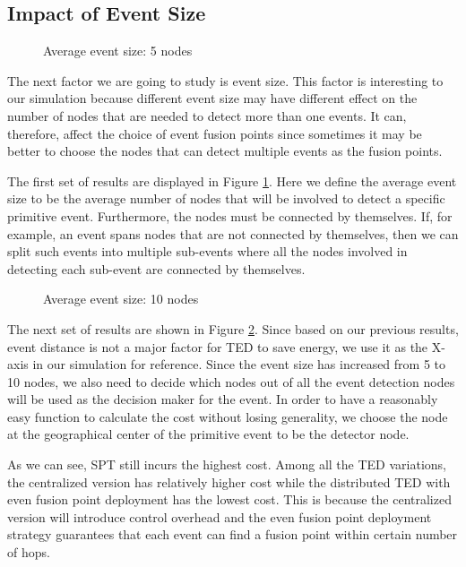 \subsection{Impact of Event Size}
\begin{figure}
\centering
{}
\caption{Average event size: 5 nodes}
\label{fig:sim-distance-size5}
\end{figure}

The next factor we are going to study is event size. This factor is interesting to our simulation because different event size may have different effect on the number of nodes that are needed to detect more than one events. It can, therefore, affect the choice of event fusion points since sometimes it may be better to choose the nodes that can detect multiple events as the fusion points.

The first set of results are displayed in Figure \ref{fig:sim-distance-size5}. Here we define the average event size to be the average number of nodes that will be involved to detect a specific primitive event. Furthermore, the nodes must be connected by themselves. If, for example, an event spans nodes that are not connected by themselves, then we can split such events into multiple sub-events where all the nodes involved in detecting each sub-event are connected by themselves.

\begin{figure}
\centering
{}
\caption{Average event size: 10 nodes}
\label{fig:sim-distance-size10}
\end{figure}

The next set of results are shown in Figure \ref{fig:sim-distance-size10}. Since based on our previous results, event distance is not a major factor for TED to save energy, we use it as the X-axis in our simulation for reference. Since the event size has increased from 5 to 10 nodes, we also need to decide which nodes out of all the event detection nodes will be used as the decision maker for the event. In order to have a reasonably easy function to calculate the cost without losing generality, we choose the node at the geographical center of the primitive event to be the detector node.

As we can see, SPT still incurs the highest cost. Among all the TED variations, the centralized version has relatively higher cost while the distributed TED with even fusion point deployment has the lowest cost. This is because the centralized version will introduce control overhead and the even fusion point deployment strategy guarantees that each event can find a fusion point within certain number of hops.

